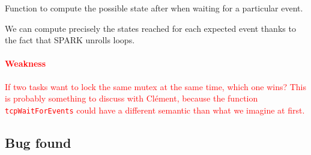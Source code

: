 \documentclass[a4paper, 10pt]{article}
\begin{document}
    \begin{algorithm}[t]
        \caption{Function to compute the possible state after when waiting for a particular event.}
        \label{algo:waitForEvents}
    \end{algorithm}

    We can compute precisely the states reached for each expected event thanks to the fact that SPARK
    unrolls loops.

    \textcolor{red}{\paragraph{Weakness} If two tasks want to lock the same mutex at the same time, which one wins?
    This is probably something to discuss with Clément, because the function \texttt{tcpWaitForEvents} could have a
    different semantic than what we imagine at first.}


    \subsection{Bug found}
\end{document}
